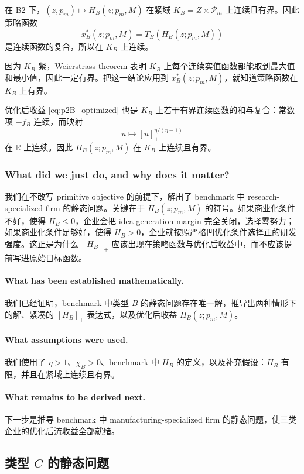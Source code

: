 在 B2 下，$(z,p_m)\mapsto H_B(z;p_m,M)$ 在紧域 $K_B=Z\times\mathcal P_m$ 上连续且有界。因此策略函数
\[
x_B^*(z;p_m,M)=T_B(H_B(z;p_m,M))
\]
是连续函数的复合，所以在 $K_B$ 上连续。

因为 $K_B$ 紧，Weierstrass theorem 表明 $K_B$ 上每个连续实值函数都能取到最大值和最小值，因此一定有界。把这一结论应用到 $x_B^*(z;p_m,M)$，就知道策略函数在 $K_B$ 上有界。

优化后收益 \eqref{eq:p2B_optimized} 也是 $K_B$ 上若干有界连续函数的和与复合：常数项 $-f_B$ 连续，而映射
\[
u\mapsto [u]_+^{\eta/(\eta-1)}
\]
在 $\mathbb R$ 上连续。因此 $\Pi_B(z;p_m,M)$ 在 $K_B$ 上连续且有界。

\subsubsection*{What did we just do, and why does it matter?}
我们在不改写 primitive objective 的前提下，解出了 benchmark 中 research-specialized firm 的静态问题。关键在于 $H_B(z;p_m,M)$ 的符号。如果商业化条件不好，使得 $H_B\le 0$，企业会把 idea-generation margin 完全关闭，选择零努力；如果商业化条件足够好，使得 $H_B>0$，企业就按照严格凹优化条件选择正的研发强度。这正是为什么 $[H_B]_+$ 应该出现在策略函数与优化后收益中，而不应该提前写进原始目标函数。

\paragraph{What has been established mathematically.}
我们已经证明，benchmark 中类型 $B$ 的静态问题存在唯一解，推导出两种情形下的解、紧凑的 $[H_B]_+$ 表达式，以及优化后收益 $\Pi_B(z;p_m,M)$。

\paragraph{What assumptions were used.}
我们使用了 $\eta>1$、$\chi_B>0$、benchmark 中 $H_B$ 的定义，以及补充假设：$H_B$ 有限，并且在紧域上连续且有界。

\paragraph{What remains to be derived next.}
下一步是推导 benchmark 中 manufacturing-specialized firm 的静态问题，使三类企业的优化后流收益全部就绪。

\subsection{类型 $C$ 的静态问题}

